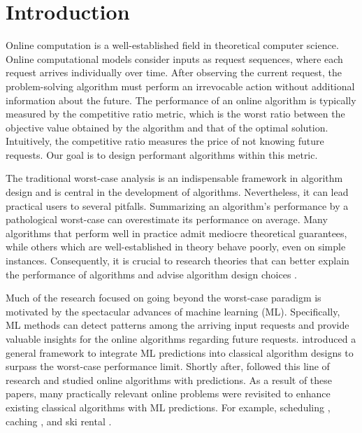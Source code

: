 
\section{Introduction}

Online computation \citep{BorodinEl-Yaniv05:Online-computation} is a well-established field in theoretical computer science. Online computational models consider inputs as request sequences, where each request arrives individually over time. After observing the current request, the problem-solving algorithm must perform an irrevocable action without additional information about the future. The performance of an online algorithm is typically measured by the competitive ratio metric, which is the worst ratio between the objective value obtained by the algorithm and that of the optimal solution. Intuitively, the competitive ratio measures the price of not knowing future requests. Our goal is to design performant algorithms within this metric.

The traditional worst-case analysis is an indispensable framework in algorithm design and is central in the development of algorithms. Nevertheless, it can lead practical users to several pitfalls. Summarizing an algorithm's performance by a pathological worst-case can overestimate its performance on average. Many algorithms that perform well in practice admit mediocre theoretical guarantees, while others which are well-established in theory behave poorly, even on simple instances. Consequently, it is crucial to research theories that can better explain the performance of algorithms and advise algorithm design choices \citep{Roughgarden19:Beyond-worst-case,Roughgarden20:Beyond-the-Worst-Case}.

Much of the research focused on going beyond the worst-case paradigm is motivated by the spectacular advances of machine learning (ML). Specifically, ML methods can detect patterns among the arriving input requests and provide valuable insights for the online algorithms regarding future requests. \cite{LykourisVassilvtiskii18:Competitive-caching} introduced a general framework to integrate ML predictions into classical algorithm designs to surpass the worst-case performance limit.
Shortly after, \cite{MitzenmacherVassilvitskii20:Beyond-the-Worst-Case}
followed this line of research and studied online algorithms with predictions. As a result of these papers, many practically relevant online problems were revisited to enhance existing classical algorithms with ML predictions. For example, scheduling \citep{LattanziLavastida20:Online-scheduling,Mitzenmacher20:Scheduling-with}, caching \citep{LykourisVassilvtiskii18:Competitive-caching,Rohatgi20:Near-optimal-bounds,AntoniadisCoester20:Online-metric}, and ski rental \citep{GollapudiPanigrahi19:Online-algorithms,KumarPurohit18:Improving-online}.

